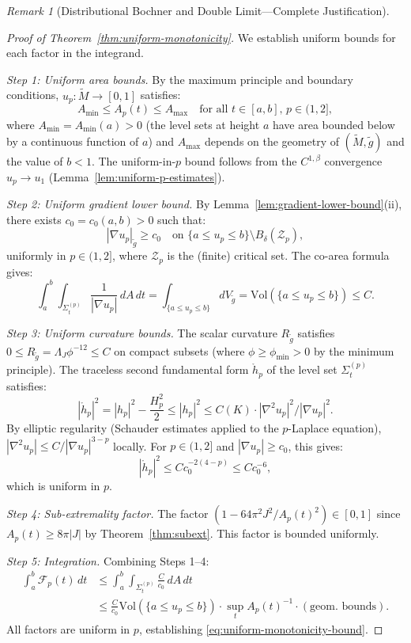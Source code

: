 \documentclass[12pt]{article}
\theoremstyle{plain}
\theoremstyle{definition}
\theoremstyle{remark}
\newtheorem{remark}[theorem]{Remark}
\newcommand{\tM}{\tilde{M}}
\newcommand{\tg}{\tilde{g}}
\begin{document}
\begin{remark}[Distributional Bochner and Double Limit---Complete Justification]
\begin{proof}[Proof of Theorem~\ref{thm:uniform-monotonicity}]
We establish uniform bounds for each factor in the integrand.

\textit{Step 1: Uniform area bounds.}
By the maximum principle and boundary conditions, $u_p: \tM \to [0, 1]$ satisfies:
\[
A_{\min} \leq A_p(t) \leq A_{\max} \quad \text{for all } t \in [a, b], \, p \in (1, 2],
\]
where $A_{\min} = A_{\min}(a) > 0$ (the level sets at height $a$ have area bounded below by a continuous function of $a$) and $A_{\max}$ depends on the geometry of $(\tM, \tg)$ and the value of $b < 1$. The uniform-in-$p$ bound follows from the $C^{1,\beta}$ convergence $u_p \to u_1$ (Lemma~\ref{lem:uniform-p-estimates}).

\textit{Step 2: Uniform gradient lower bound.}
By Lemma~\ref{lem:gradient-lower-bound}(ii), there exists $c_0 = c_0(a, b) > 0$ such that:
\[
|\nabla u_p|_{\tg} \geq c_0 \quad \text{on } \{a \leq u_p \leq b\} \setminus B_\delta(\mathcal{Z}_p),
\]
uniformly in $p \in (1, 2]$, where $\mathcal{Z}_p$ is the (finite) critical set. The co-area formula gives:
\[
\int_a^b \int_{\Sigma_t^{(p)}} \frac{1}{|\nabla u_p|}\, dA\, dt = \int_{\{a \leq u_p \leq b\}} dV_{\tg} = \mathrm{Vol}(\{a \leq u_p \leq b\}) \leq C.
\]

\textit{Step 3: Uniform curvature bounds.}
The scalar curvature $R_{\tg}$ satisfies $0 \leq R_{\tg} = \Lambda_J \phi^{-12} \leq C$ on compact subsets (where $\phi \geq \phi_{\min} > 0$ by the minimum principle). The traceless second fundamental form $\mathring{h}_p$ of the level set $\Sigma_t^{(p)}$ satisfies:
\[
|\mathring{h}_p|^2 = |h_p|^2 - \frac{H_p^2}{2} \leq |h_p|^2 \leq C(K) \cdot |\nabla^2 u_p|^2 / |\nabla u_p|^2.
\]
By elliptic regularity (Schauder estimates applied to the $p$-Laplace equation), $|\nabla^2 u_p| \leq C/|\nabla u_p|^{3-p}$ locally. For $p \in (1, 2]$ and $|\nabla u_p| \geq c_0$, this gives:
\[
|\mathring{h}_p|^2 \leq C c_0^{-2(4-p)} \leq C c_0^{-6},
\]
which is uniform in $p$.

\textit{Step 4: Sub-extremality factor.}
The factor $(1 - 64\pi^2 J^2/A_p(t)^2) \in [0, 1]$ since $A_p(t) \geq 8\pi|J|$ by Theorem~\ref{thm:subext}. This factor is bounded uniformly.

\textit{Step 5: Integration.}
Combining Steps 1--4:
\begin{align*}
\int_a^b \mathcal{F}_p(t)\, dt &\leq \int_a^b \int_{\Sigma_t^{(p)}} \frac{C}{c_0}\, dA\, dt \\
&\leq \frac{C}{c_0} \mathrm{Vol}(\{a \leq u_p \leq b\}) \cdot \sup_t A_p(t)^{-1} \cdot (\text{geom.\ bounds}).
\end{align*}
All factors are uniform in $p$, establishing \eqref{eq:uniform-monotonicity-bound}.
\end{proof}


\end{remark}
\end{document}
